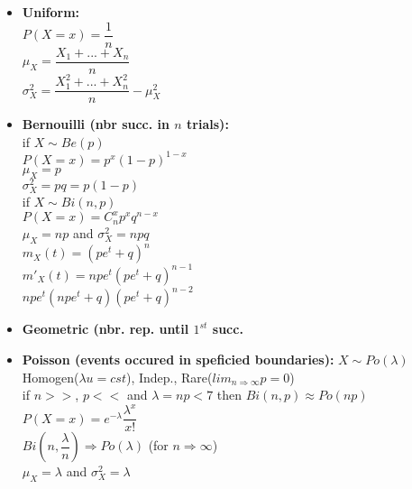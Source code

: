 \documentclass[a4paper, 10pt, landscape]{article}
\begin{document}
\begin{multicols*}{4}
\begin{itemize}
\item{\textbf{Uniform:} \\ \textbullet $P(X=x) = \dfrac{1}{n}$ \\ \textbullet $\mu_X = \dfrac{X_1 + ... + X_n}{n}$ \\ \textbullet $\sigma_X^2 = \dfrac{X_1^2 + ... + X_n^2}{n} - \mu_X^2$}
\item{\textbf{Bernouilli (nbr succ. in $n$ trials):} \\ if $X\sim Be(p)$ \\ \textbullet $P(X=x)=p^x(1-p)^{1-x}$ \\ \textbullet $\mu_X = p$ \\ \textbullet $\sigma_X^2 = pq = p(1-p)$ \\ if $X\sim Bi(n,p)$ \\ \textbullet $P(X=x)=C_n^xp^xq^{n-x}$ \\ \textbullet $\mu_X = np$ and $\sigma_X^2=npq$ \\ \textbullet $m_X(t)=(pe^t+q)^n$ \\ \textbullet $m'_X(t) = npe^t(pe^t+q)^{n-1}$ \\ \textbullet $npe^t(npe^t+q)(pe^t+q)^{n-2}$}
\item{\textbf{Geometric (nbr. rep. until $1^{st}$ succ.}}
\item{\textbf{Poisson (events occured in speficied boundaries):} $X\sim Po(\lambda)$ \\ \textbullet Homogen($\lambda u = cst$), Indep., Rare($lim_{n\Rightarrow \infty} p =0$) \\ \textbullet if $n>>$, $p<<$ and $\lambda=np<7$ then $Bi(n,p)\approx Po(np)$ \\ \textbullet $P(X=x)=e^{-\lambda}\dfrac{\lambda^x}{x!}$ \\ \textbullet $Bi(n,\dfrac{\lambda}{n}) \Rightarrow Po(\lambda)$ (for $n \Rightarrow \infty$) \\ \textbullet $\mu_X=\lambda$ and $\sigma_X^2=\lambda$}
\end{itemize}



\end{multicols*}
\end{document}

